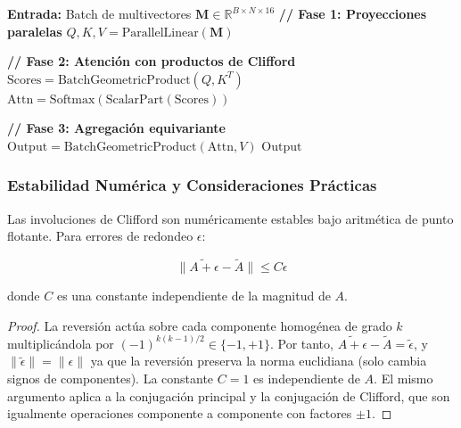 \begin{algorithm}[H]
\caption{Implementación GPU-optimizada de GATr}
\label{alg:gatr_gpu}
\begin{algorithmic}[1]
    \State \textbf{Entrada:} Batch de multivectores $\mathbf{M} \in \mathbb{R}^{B \times N \times 16}$
        \State \textbf{// Fase 1: Proyecciones paralelas}
        \State $Q, K, V = \text{ParallelLinear}(\mathbf{M})$ 
        
        \State \textbf{// Fase 2: Atención con productos de Clifford}
        \State $\text{Scores} = \text{BatchGeometricProduct}(Q, K^T)$ 
        \State $\text{Attn} = \text{Softmax}(\text{ScalarPart}(\text{Scores}))$
        
        \State \textbf{// Fase 3: Agregación equivariante}
        \State $\text{Output} = \text{BatchGeometricProduct}(\text{Attn}, V)$
        \State \Return $\text{Output}$
    \EndFunction
\end{algorithmic}
\end{algorithm}

\subsubsection{Estabilidad Numérica y Consideraciones Prácticas}

\begin{proposition}\label{prop:estabilidad_numerica_involuciones}
Las involuciones de Clifford son numéricamente estables bajo aritmética de punto flotante. Para errores de redondeo $\epsilon$:

\begin{equation}
    \|\widetilde{A + \epsilon} - \widetilde{A}\| \leq C\epsilon
\end{equation}

donde $C$ es una constante independiente de la magnitud de $A$.
\end{proposition}

\begin{proof}
La reversión actúa sobre cada componente homogénea de grado $k$ multiplicándola por $(-1)^{k(k-1)/2} \in \{-1, +1\}$. Por tanto, $\widetilde{A + \epsilon} - \widetilde{A} = \widetilde{\epsilon}$, y $\|\widetilde{\epsilon}\| = \|\epsilon\|$ ya que la reversión preserva la norma euclidiana (solo cambia signos de componentes). La constante $C = 1$ es independiente de $A$. El mismo argumento aplica a la conjugación principal y la conjugación de Clifford, que son igualmente operaciones componente a componente con factores $\pm 1$.
\end{proof}

